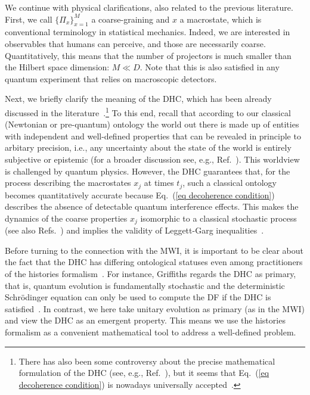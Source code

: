 \documentclass[pre,onecolumn,12pt,aps,longbibliography,nofootinbib]{revtex4-2}
\begin{document}
We continue with physical clarifications, also related to the previous literature.
First, we call $\{\Pi_x\}_{x=1}^M$ a {coarse-graining} and $x$ a {macrostate}, which is conventional terminology in statistical mechanics. Indeed, we are interested in observables that humans can perceive, and those are necessarily coarse. Quantitatively, this means that the number of projectors is much smaller than the Hilbert space dimension: $M\ll D$. Note that this is also satisfied in any quantum experiment that relies on macroscopic detectors.

Next, we briefly clarify the meaning of the DHC, which has been already discussed in the literature~\cite{GriffithsJSP1984, GellMannHartleInBook1990, OmnesRMP1992, DowkerHalliwellPRD1992, GellMannHartlePRD1993, HalliwellANY1995, DowkerKentJSP1996, GriffithsBook2002, GellMannHartlePRA2007, Griffiths2019}.\footnote{There has also been some controversy about the precise mathematical formulation of the DHC (see, e.g., Ref.~\cite{DiosiPRL2004}), but it seems that Eq.~(\ref{eq decoherence condition}) is nowadays universally accepted~\cite{Griffiths2019}. } To this end, recall that according to our classical (Newtonian or pre-quantum) ontology the world out there is made up of entities with independent and well-defined properties that can be revealed in principle to arbitary precision, i.e., any uncertainty about the state of the world is entirely subjective or epistemic (for a broader discussion see, e.g., Ref.~\cite{Barad2007}). This worldview is challenged by quantum physics. However, the DHC guarantees that, {for} the process describing the macrostates $x_j$ at times $t_j$, such a classical ontology becomes quantitatively accurate because Eq.~(\ref{eq decoherence condition}) describes the absence of detectable quantum interference effects. This makes the dynamics of the coarse properties $x_j$ isomorphic to a classical stochastic process (see also Refs.~\cite{SmirneEtAlQST2018, StrasbergDiazPRA2019, MilzEtAlQuantum2020, MilzEtAlPRX2020, MilzModiPRXQ2021, StrasbergBook2022, StrasbergEtAlPRA2023, StrasbergSP2023, SzankowskiCywinskiArXiv2023}) and implies the validity of Leggett-Garg inequalities~\cite{EmaryLambertNoriRPP2014}.

Before turning to the connection with the MWI, it is important to be clear about the fact that the DHC has differing ontological statuses even among practitioners of the histories formalism~\cite{OmnesRMP1992, DowkerKentJSP1996}. For instance, Griffiths regards the DHC as {primary}, that is, quantum evolution is fundamentally stochastic and the deterministic Schr\"odinger equation can only be used to compute the DF {if} the DHC is satisfied~\cite{GriffithsJSP1984, GriffithsBook2002, Griffiths2019}. In contrast, we here take unitary evolution as primary (as in the MWI) and view the DHC as an {emergent} property. This means we use the histories formalism as a convenient mathematical tool to address a well-defined problem.
\end{document}

